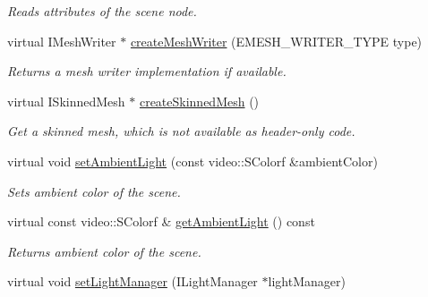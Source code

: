 \begin{DoxyCompactItemize}
\begin{DoxyCompactList}\small\item\em Reads attributes of the scene node. \end{DoxyCompactList}\item 
\hypertarget{classirr_1_1scene_1_1_c_scene_manager_aa2d700e463282638e281e8a3cf7dd521}{virtual I\-Mesh\-Writer $\ast$ \hyperlink{classirr_1_1scene_1_1_c_scene_manager_aa2d700e463282638e281e8a3cf7dd521}{create\-Mesh\-Writer} (E\-M\-E\-S\-H\-\_\-\-W\-R\-I\-T\-E\-R\-\_\-\-T\-Y\-P\-E type)}\label{classirr_1_1scene_1_1_c_scene_manager_aa2d700e463282638e281e8a3cf7dd521}

\begin{DoxyCompactList}\small\item\em Returns a mesh writer implementation if available. \end{DoxyCompactList}\item 
\hypertarget{classirr_1_1scene_1_1_c_scene_manager_aebf93f9a55e6b25f87d6d649ac5277c1}{virtual I\-Skinned\-Mesh $\ast$ \hyperlink{classirr_1_1scene_1_1_c_scene_manager_aebf93f9a55e6b25f87d6d649ac5277c1}{create\-Skinned\-Mesh} ()}\label{classirr_1_1scene_1_1_c_scene_manager_aebf93f9a55e6b25f87d6d649ac5277c1}

\begin{DoxyCompactList}\small\item\em Get a skinned mesh, which is not available as header-\/only code. \end{DoxyCompactList}\item 
\hypertarget{classirr_1_1scene_1_1_c_scene_manager_ac9eb692e211d21ff104dc0f42c0cd6c4}{virtual void \hyperlink{classirr_1_1scene_1_1_c_scene_manager_ac9eb692e211d21ff104dc0f42c0cd6c4}{set\-Ambient\-Light} (const video\-::\-S\-Colorf \&ambient\-Color)}\label{classirr_1_1scene_1_1_c_scene_manager_ac9eb692e211d21ff104dc0f42c0cd6c4}

\begin{DoxyCompactList}\small\item\em Sets ambient color of the scene. \end{DoxyCompactList}\item 
\hypertarget{classirr_1_1scene_1_1_c_scene_manager_ae6616a815396418f296145253645e796}{virtual const video\-::\-S\-Colorf \& \hyperlink{classirr_1_1scene_1_1_c_scene_manager_ae6616a815396418f296145253645e796}{get\-Ambient\-Light} () const }\label{classirr_1_1scene_1_1_c_scene_manager_ae6616a815396418f296145253645e796}

\begin{DoxyCompactList}\small\item\em Returns ambient color of the scene. \end{DoxyCompactList}\item 
\hypertarget{classirr_1_1scene_1_1_c_scene_manager_ab341febdc7b2f39a43ecd5e219c7ba24}{virtual void \hyperlink{classirr_1_1scene_1_1_c_scene_manager_ab341febdc7b2f39a43ecd5e219c7ba24}{set\-Light\-Manager} (I\-Light\-Manager $\ast$light\-Manager)}\label{classirr_1_1scene_1_1_c_scene_manager_ab341febdc7b2f39a43ecd5e219c7ba24}


\end{DoxyCompactItemize}
